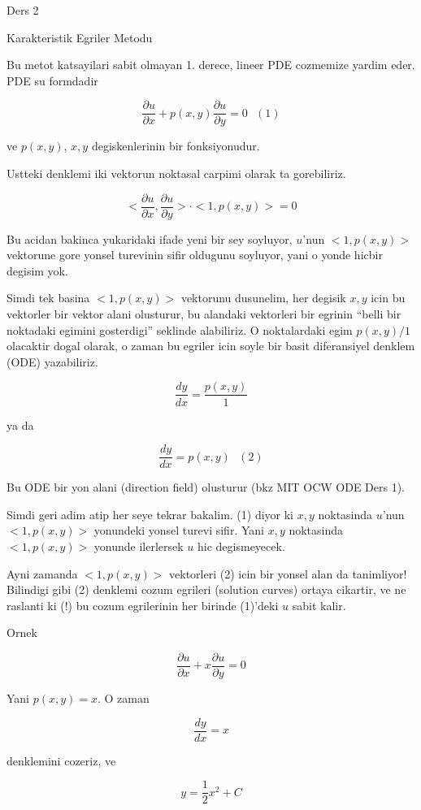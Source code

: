 \documentclass[12pt,fleqn]{article}
\begin{document}
Ders 2

Karakteristik Egriler Metodu

Bu metot katsayilari sabit olmayan 1. derece, lineer PDE cozmemize yardim
eder. PDE su formdadir

\[ \frac{\partial u}{\partial x} + 
p(x,y) \frac{\partial u}{\partial y} = 0 
\ \ \ (1)
 \]

ve $p(x,y)$, $x,y$ degiskenlerinin bir fonksiyonudur. 

Ustteki denklemi iki vektorun noktasal carpimi olarak ta gorebiliriz. 

\[ 
<\frac{\partial u}{\partial x}, \frac{\partial u}{\partial y}> \cdot 
<1,p(x,y)> = 0
 \]

Bu acidan bakinca yukaridaki ifade yeni bir sey soyluyor, $u$'nun
$<1,p(x,y)>$ vektorune gore yonsel turevinin sifir oldugunu soyluyor, yani
o yonde hicbir degisim yok. 

Simdi tek basina $<1,p(x,y)>$ vektorunu dusunelim, her degisik $x,y$ icin
bu vektorler bir vektor alani olusturur, bu alandaki vektorleri bir egrinin
``belli bir noktadaki egimini gosterdigi'' seklinde alabiliriz. O
noktalardaki egim $p(x,y) / 1$ olacaktir dogal olarak, o zaman bu egriler
icin soyle bir basit diferansiyel denklem (ODE) yazabiliriz.

\[ \frac{dy}{dx} = \frac{p(x,y)}{1} \]

ya da

\[ \frac{dy}{dx} = p(x,y) 
\ \ \ (2)
\]

Bu ODE bir yon alani (direction field) olusturur (bkz MIT OCW ODE Ders 1).

Simdi geri adim atip her seye tekrar bakalim. (1) diyor ki $x,y$ noktasinda
$u$'nun $<1,p(x,y)>$ yonundeki yonsel turevi sifir. Yani $x,y$ noktasinda
$<1,p(x,y)>$ yonunde ilerlersek $u$ hic degismeyecek. 

Ayni zamanda $<1,p(x,y)>$ vektorleri (2) icin bir yonsel alan da
tanimliyor!  Bilindigi gibi (2) denklemi cozum egrileri (solution curves)
ortaya cikartir, ve ne raslanti ki (!) bu cozum egrilerinin her birinde
(1)'deki $u$ sabit kalir. 

Ornek 

\[ \frac{\partial u}{\partial x} + 
x \frac{\partial u}{\partial y} = 0 
 \]

Yani $p(x,y) = x$. O zaman 

\[ \frac{dy}{dx} = x \]

denklemini cozeriz, ve 

\[ y = \frac{1}{2}x^2 + C \]
\end{document}
